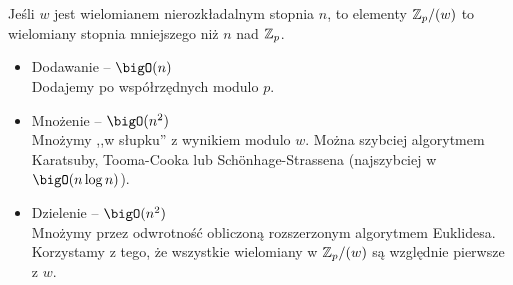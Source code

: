 Jeśli \( w \) jest wielomianem nierozkładalnym stopnia \( n \), to elementy \( \mathbb{Z}_p/(w) \) to wielomiany stopnia mniejszego niż \( n \) nad \( \mathbb{Z}_p \).
\begin{itemize}
	\item Dodawanie -- \( \bigO(n) \) \\
	      Dodajemy po współrzędnych modulo \( p \).
	\item Mnożenie -- \( \bigO(n^2) \) \\
	      Mnożymy ,,w słupku'' z wynikiem modulo \( w \). Można szybciej algorytmem Karatsuby, Tooma-Cooka lub Sch\"onhage-Strassena (najszybciej w \( \bigO(n\log n) \)).
	\item Dzielenie -- \( \bigO(n^2) \) \\
	      Mnożymy przez odwrotność obliczoną rozszerzonym algorytmem Euklidesa. Korzystamy z tego, że wszystkie wielomiany w \( \mathbb{Z}_p/(w) \) są względnie pierwsze z \( w \).
\end{itemize}
